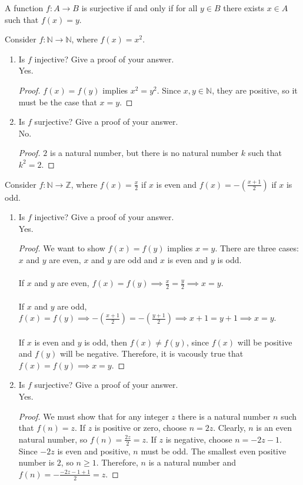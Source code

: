\documentclass[]{exam}
\theoremstyle{definition}
\newcommand{\bb}[1]{\mathbb{#1}}
\newcommand{\Z}{\bb{Z}}
\newcommand{\N}{\bb{N}}
\begin{document}
\begin{questions}
A function $f: A \to B$ is surjective if and only if for all $y \in B$ there
exists $x \in A$ such that $f(x) = y$. 

\question Consider $f: \N \to \N$, where $f(x) = x^2$.

\begin{enumerate}[label=\alph*)]
\item Is $f$ injective? Give a proof of your answer.
\\
Yes.
\begin{proof}
$f(x) = f(y)$ implies $x^2 = y^2$. Since $x,y \in \N$, they
are positive, so it must be the case that $x = y$.
\end{proof}

\item Is $f$ surjective? Give a proof of your answer.
\\
No.
\begin{proof}
$2$ is a natural number, but there is no natural number $k$ such that
$k^2 = 2$.
\end{proof}

\end{enumerate}


\question Consider $f: \N \to \Z$, where $f(x) = \frac{x}{2}$ if $x$ is even
and $f(x) = -\left (\frac{x+1}{2} \right) $ if $x$ is odd.
\begin{enumerate}[label=\alph*)]
\item Is $f$ injective? Give a proof of your answer.
\\
Yes.
\begin{proof}
We want to show $f(x) = f(y)$ implies $x = y$. There are three cases:
$x$ and $y$ are even, $x$ and $y$ are odd and $x$ is even and $y$ is odd.
\\~\\
If $x$ and $y$ are even, $f(x) = f(y) \implies \frac{x}{2} = \frac{y}{2}
\implies x = y$.
\\~\\
If $x$ and $y$ are odd, 
$f(x) = f(y) \implies - \left (\frac{x + 1}{2} \right ) = - \left (\frac{y + 1}{2} \right
    ) \implies x + 1 = y + 1 \implies x = y$.
\\~\\
If $x$ is even and $y$ is odd, then $f(x) \neq f(y)$, since $f(x)$ will be
positive and $f(y)$ will be negative. Therefore, it is vacously true that
$f(x) = f(y) \implies x = y$.

\end{proof}

\item Is $f$ surjective? Give a proof of your answer.
\\
Yes.
\begin{proof}
We must show that for any integer $z$ there is a natural number $n$ such that
$f(n) = z$. If $z$ is positive or zero, choose $n = 2z$. Clearly, $n$ is an 
even natural number, so $f(n) = \frac{2z}{2} = z$. If $z$ is negative, 
choose $n = -2z - 1$. Since $-2z$ is even and positive, $n$ must be odd.
The smallest even positive number is $2$, so $n \geq 1$. Therefore, $n$
is a natural number and $f(n) = -\frac{-2z -1 + 1}{2} = z$.
\end{proof}


\end{enumerate}
\end{questions}
\end{document}
